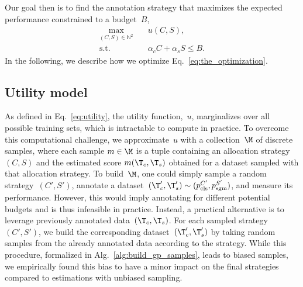 
Our goal then is to find the annotation strategy that maximizes the expected performance constrained to a budget~$B$,
\begin{equation}
\label{eq:the_optimization}
\begin{aligned}
    \max_{(C,S)\in\mathbb{N}^2} \quad & u(C, S), \\
    \textrm{s.t.} \quad & \alpha_cC+\alpha_sS \le B.
\end{aligned}
\end{equation}
In the following, we describe how we optimize Eq.~\eqref{eq:the_optimization}.

\subsection{Utility model}

As defined in Eq.~\eqref{eq:utility}, the utility function,~$u$, marginalizes over all possible training sets, which is intractable to compute in practice. To overcome this computational challenge, we approximate~$u$ with a collection~$\M$ of discrete samples, where each sample $m\in\M$ is a tuple containing an allocation strategy~$(C, S)$ and the estimated score $m(\T_c, \T_s)$ obtained for a dataset sampled with that allocation strategy. To build~$\M$, one could simply sample a random strategy~$(C', S')$, annotate a dataset~$(\T'_c, \T'_s)\sim{}(p_\textrm{cls}^{C'}, p_\textrm{sgm}^{S'})$, and measure its performance. However, this would imply annotating for different potential budgets and is thus infeasible in practice. Instead, a practical alternative is to leverage previously annotated data~$(\T_c, \T_s)$. For each sampled strategy~$(C', S')$, we build the corresponding dataset~$(\T'_c, \T'_s)$ by taking random samples from the already annotated data according to the strategy. While this procedure, formalized in Alg.~\ref{alg:build_gp_samples}, leads to biased samples, we empirically found this bias to have a minor impact on the final strategies compared to estimations with unbiased sampling.


